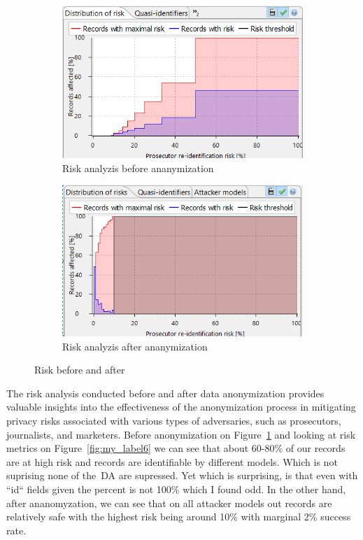 \begin{figure}[ht]
  \centering

  \begin{subfigure}{0.49\textwidth}
    \centering
    \includegraphics[width=\linewidth]{assets/risk_before}
    \caption{Risk analyzis before ananymization}
    \label{fig:subim3}
  \end{subfigure}
  \hfill
  \begin{subfigure}{0.49\textwidth}
    \centering
    \includegraphics[width=\linewidth]{assets/risk_after}
    \caption{Risk analyzis after ananymization}
    \label{fig:subim4}
  \end{subfigure}

  \caption{Risk before and after}
  \label{fig:image3}
\end{figure}

The risk analysis conducted before and after data anonymization provides valuable insights into the effectiveness of the anonymization
process in mitigating privacy risks associated with various types of adversaries, such as prosecutors, journalists, and marketers. Before
anonymization on Figure~\ref{fig:subim3} and looking at risk metrics on Figure~\ref{fig:my_label6} we can see that about 60-80\% of our
records are at high risk and records are identifiable by different models. Which is not suprising none of the~\ac{DA} are supressed. Yet
which is surprising, is that even with ``id`` fields given the percent is not 100\% which I found odd. In the other hand, after
ananomyzation, we can see that on all attacker models out records are relatively safe with the highest risk being around 10\% with
marginal 2\% success rate.

